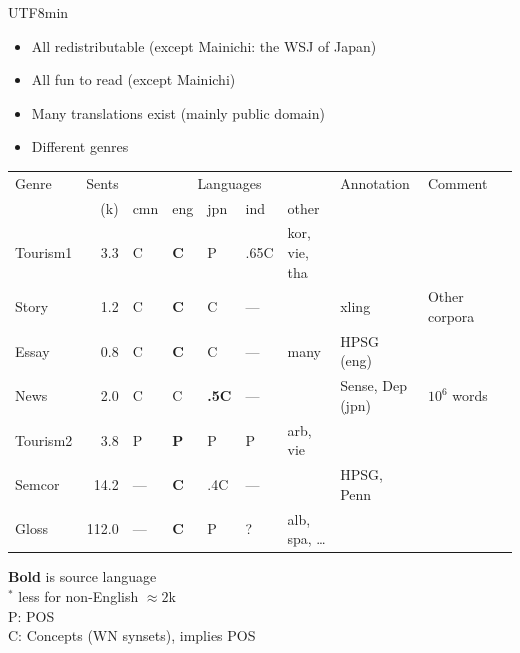\documentclass[25pt,landscape,headrule,footrule,dvips]{foils}
\newcommand{\emp}[1]{\textcolor{red}{#1}}
\newcommand{\myslide}[1]{\foilhead[-25mm]{\raisebox{12mm}[0mm]{\emp{#1}}}}
\begin{document}
\begin{CJK}{UTF8}{min}
\begin{itemize}
\item All redistributable (except Mainichi: the WSJ of Japan)
\item All fun to read (except Mainichi)
\item Many translations exist (mainly public domain)
\item Different genres
\end{itemize}

\myslide{Languages and Status}

\begin{small}
  \centering
  \begin{tabular}{lrllllllll}
    Genre & Sents        & \multicolumn{5}{c}{Languages} & Annotation & Comment \\
          & (k) &   cmn & eng & jpn & ind & other\\
\hline
    Tourism1 & 3.3 & C &  \textbf{C} & P  & .65C & kor, vie, tha 
    &   & \\
    Story    & 1.2  & C &  \textbf{C} & C & --- &  
    & xling  & Other corpora \\
    Essay    & 0.8 & C & \textbf{C} & C & --- & many 
    & HPSG (eng) \\
    News     & 2.0  & C & C & \textbf{.5C}  & --- &
    & Sense, Dep (jpn) & $10^6$ words\\
    \hline
    Tourism2 & 3.8 &  P & \textbf{P} & P & P & arb, vie\\
    Semcor & 14.2 &   --- & \textbf{C} & .4C & ---& & HPSG, Penn\\ %
    Gloss  & 112.0 & --- & \textbf{C} & P & ? & alb, spa, \ldots\\
  \end{tabular}
  \begin{flushleft} \small
    \textbf{Bold} is source language
    \\ $^*$ less for non-English $\approx 2$k
    \\ P: POS 
    \\ C: Concepts (WN synsets), implies POS 
  \end{flushleft}
\end{small}





\end{CJK}
\end{document}

